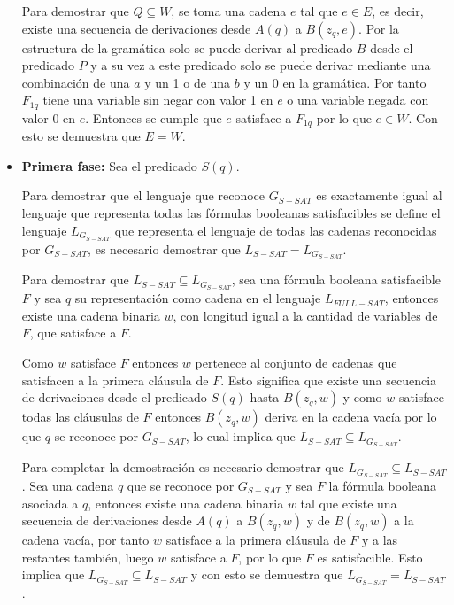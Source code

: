 \documentclass[12pt]{article}
\begin{document}
\begin{itemize}
          Para demostrar que $Q\subseteq W$, se toma una cadena $e$ tal que $e\in E$, es decir, existe una
          secuencia de derivaciones desde $A(q)$ a $B(z_q,e)$. Por la estructura de la gramática solo se
          puede derivar al predicado $B$ desde el predicado $P$ y a su vez a este predicado solo se puede
          derivar mediante una combinación de una $a$ y un 1 o de una $b$ y un 0 en la gramática. Por tanto
          $F_{1q}$ tiene una variable sin negar con valor 1 en $e$ o una variable negada con valor 0 en $e$.
          Entonces se cumple que $e$ satisface a $F_{1q}$ por lo que $e\in W$. Con esto se demuestra que $E=W$.

    \item \textbf{Primera fase:} Sea el predicado $S(q)$.

          Para demostrar que el lenguaje que reconoce $G_{S-SAT}$ es exactamente igual al lenguaje que
          representa todas las fórmulas booleanas satisfacibles se define el lenguaje $L_{G_{S-SAT}}$
          que representa el lenguaje de todas las cadenas reconocidas por $G_{S-SAT}$, es necesario
          demostrar que $L_{S-SAT}=L_{G_{S-SAT}}$.

          Para demostrar que $L_{S-SAT}\subseteq L_{G_{S-SAT}}$, sea una fórmula booleana satisfacible $F$ y sea $q$ su representación como cadena en el lenguaje $L_{FULL-SAT}$,
          entonces existe una cadena binaria $w$, con longitud igual a la cantidad de variables de $F$, que satisface
          a $F$.

          Como $w$ satisface $F$ entonces $w$ pertenece al conjunto de cadenas que satisfacen a la primera
          cláusula de $F$. Esto significa que existe una secuencia de derivaciones desde el predicado $S(q)$
          hasta $B(z_q,w)$ y como $w$ satisface todas las cláusulas de $F$ entonces $B(z_q,w)$ deriva en la
          cadena vacía por lo que $q$ se reconoce por $G_{S-SAT}$, lo cual implica que $L_{S-SAT}\subseteq L_{G_{S-SAT}}$.

          Para completar la demostración es necesario demostrar que $ L_{G_{S-SAT}}\subseteq L_{S-SAT}$. Sea una cadena
          $q$ que se reconoce por $G_{S-SAT}$ y sea $F$ la fórmula booleana asociada a $q$, entonces existe una cadena
          binaria $w$ tal que existe una secuencia de derivaciones desde $A(q)$ a $B(z_q,w)$ y de $B(z_q,w)$ a la cadena vacía,
          por tanto $w$ satisface a la primera cláusula de $F$ y a las restantes también, luego $w$ satisface a $F$,
          por lo que $F$ es satisfacible. Esto implica que $L_{G_{S-SAT}}\subseteq L_{S-SAT}$ y con esto se demuestra que
          $L_{G_{S-SAT}}= L_{S-SAT}$.

\end{itemize}
\end{document}
